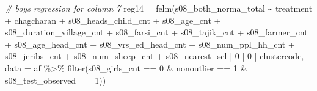 \documentclass[
]{article}
\newenvironment{Shaded}{\begin{snugshade}}{\end{snugshade}}
\newcommand{\AttributeTok}[1]{\textcolor[rgb]{0.77,0.63,0.00}{#1}}
\newcommand{\CommentTok}[1]{\textcolor[rgb]{0.56,0.35,0.01}{\textit{#1}}}
\newcommand{\DecValTok}[1]{\textcolor[rgb]{0.00,0.00,0.81}{#1}}
\newcommand{\FunctionTok}[1]{\textcolor[rgb]{0.00,0.00,0.00}{#1}}
\newcommand{\NormalTok}[1]{#1}
\newcommand{\OtherTok}[1]{\textcolor[rgb]{0.56,0.35,0.01}{#1}}
\newcommand{\SpecialCharTok}[1]{\textcolor[rgb]{0.00,0.00,0.00}{#1}}
\begin{document}
\begin{Shaded}
\begin{Highlighting}[]
\CommentTok{\# boys regression for column 7}
\NormalTok{reg14 }\OtherTok{=} \FunctionTok{felm}\NormalTok{(s08\_both\_norma\_total }\SpecialCharTok{\textasciitilde{}}\NormalTok{ treatment }\SpecialCharTok{+}\NormalTok{ chagcharan }\SpecialCharTok{+} 
\NormalTok{               s08\_heads\_child\_cnt  }\SpecialCharTok{+}\NormalTok{ s08\_age\_cnt }\SpecialCharTok{+}
\NormalTok{               s08\_duration\_village\_cnt }\SpecialCharTok{+}\NormalTok{ s08\_farsi\_cnt }\SpecialCharTok{+}\NormalTok{ s08\_tajik\_cnt }\SpecialCharTok{+}
\NormalTok{               s08\_farmer\_cnt }\SpecialCharTok{+}\NormalTok{ s08\_age\_head\_cnt }\SpecialCharTok{+}\NormalTok{ s08\_yrs\_ed\_head\_cnt }\SpecialCharTok{+} 
\NormalTok{               s08\_num\_ppl\_hh\_cnt }\SpecialCharTok{+}\NormalTok{ s08\_jeribs\_cnt }\SpecialCharTok{+}\NormalTok{ s08\_num\_sheep\_cnt }\SpecialCharTok{+}
\NormalTok{               s08\_nearest\_scl }\SpecialCharTok{|} \DecValTok{0} \SpecialCharTok{|} \DecValTok{0} \SpecialCharTok{|}\NormalTok{ clustercode, }
            \AttributeTok{data =}\NormalTok{ af }\SpecialCharTok{\%\textgreater{}\%} \FunctionTok{filter}\NormalTok{(s08\_girls\_cnt }\SpecialCharTok{==} \DecValTok{0} \SpecialCharTok{\&} 
\NormalTok{                                 nonoutlier }\SpecialCharTok{==} \DecValTok{1} \SpecialCharTok{\&}
\NormalTok{                                 s08\_test\_observed }\SpecialCharTok{==} \DecValTok{1}\NormalTok{))}
\end{Highlighting}
\end{Shaded}
\end{document}
